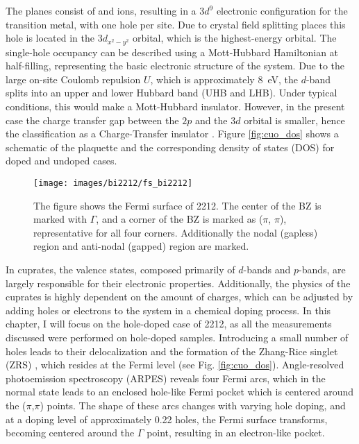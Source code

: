 The  planes consist of  and  ions, resulting in a $3d^9$ electronic configuration for the transition metal, with one hole per site.
Due to crystal field splitting places this hole is located in the $3d_{x^2-y^2}$ orbital, which is the highest-energy orbital.
The single-hole occupancy can be described using a Mott-Hubbard Hamiltonian at half-filling, representing the basic electronic structure of the system.
Due to the large on-site Coulomb repulsion $U$, which is approximately \qty{8}{\electronvolt}, the $d$-band splits into an upper and lower Hubbard band (UHB and LHB).
Under typical conditions, this would make  a Mott-Hubbard insulator.
However, in the present case the charge transfer gap between the  $2p$ and the  $3d$ orbital is smaller, hence the classification as a Charge-Transfer insulator \cite{zaanen_band_1985,zegrodnik_superconductivity_2019}.
Figure \ref{fig:cuo_dos} shows a schematic of the  plaquette and the corresponding density of states (DOS) for doped and undoped cases.

\begin{figure}
	\centering
	\texttt{[image: images/bi2212/fs\_bi2212]}
	\caption{The figure shows the Fermi surface of 2212. The center of the BZ is marked with $\Gamma$, and a corner of the BZ is marked as ($\pi$, $\pi$), representative for all four corners. Additionally the nodal (gapless) region and anti-nodal (gapped) region are marked.}
	\label{fig:fsbi2212}
\end{figure}

In cuprates, the valence states, composed primarily of  $d$-bands and  $p$-bands, are largely responsible for their electronic properties.
Additionally, the physics of the cuprates is highly dependent on the amount of charges, which can be adjusted by adding holes or electrons to the system in a chemical doping process.
In this chapter, I will focus on the hole-doped case of 2212, as all the measurements discussed were performed on hole-doped samples.
Introducing a small number of holes leads to their delocalization and the formation of the Zhang-Rice singlet (ZRS) \cite{zhang_effective_1988}, which resides at the Fermi level (see Fig. \ref{fig:cuo_dos}).
Angle-resolved photoemission spectroscopy (ARPES) reveals four Fermi arcs, which in the normal state leads to an enclosed hole-like Fermi pocket which is centered around the ($\pi$,$\pi$) points.
The shape of these arcs changes with varying hole doping, and at a doping level of approximately 0.22 holes, the Fermi surface transforms, becoming centered around the $\Gamma$ point, resulting in an electron-like pocket.

